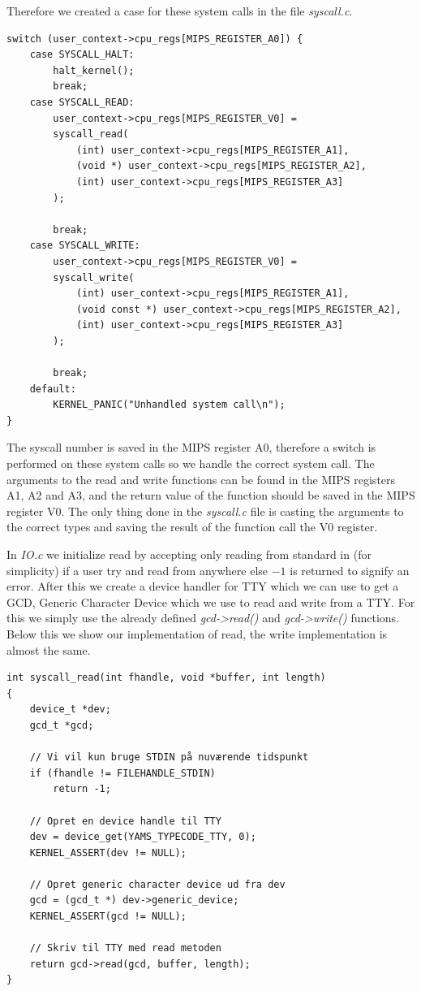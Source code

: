 \documentclass[11pt]{article}
\begin{document}
Therefore we created a case for these system calls in the file
\textit{syscall.c}.

\begin{lstlisting}[style=customc]
switch (user_context->cpu_regs[MIPS_REGISTER_A0]) {
    case SYSCALL_HALT:
        halt_kernel();
        break;
    case SYSCALL_READ:
        user_context->cpu_regs[MIPS_REGISTER_V0] =
        syscall_read(
            (int) user_context->cpu_regs[MIPS_REGISTER_A1],
            (void *) user_context->cpu_regs[MIPS_REGISTER_A2],
            (int) user_context->cpu_regs[MIPS_REGISTER_A3]
        );

        break;
    case SYSCALL_WRITE:
        user_context->cpu_regs[MIPS_REGISTER_V0] =
        syscall_write(
            (int) user_context->cpu_regs[MIPS_REGISTER_A1],
            (void const *) user_context->cpu_regs[MIPS_REGISTER_A2],
            (int) user_context->cpu_regs[MIPS_REGISTER_A3]
        );

        break;
    default:
        KERNEL_PANIC("Unhandled system call\n");
}
\end{lstlisting}

The syscall number is saved in the MIPS register A0, therefore a switch is
performed on these system calls so we handle the correct system call.  The
arguments to the read and write functions can be found in the MIPS registers
A1, A2 and A3, and the return value of the function should be saved in the MIPS
register V0.  The only thing done in the \textit{syscall.c} file is casting the
arguments to the correct types and saving the result of the function call the V0
register.

In \textit{IO.c} we initialize read by accepting only reading from standard in
(for simplicity) if a user try and read from anywhere else $-1$ is returned to
signify an error.  After this we create a device handler for TTY which we can
use to get a GCD, Generic Character Device which we use to read and write from a
TTY.  For this we simply use the already defined \emph{gcd->read()} and
\emph{gcd->write()} functions.  Below this we show our implementation of read,
the write implementation is almost the same.

\begin{lstlisting}[style=customc]
int syscall_read(int fhandle, void *buffer, int length)
{
    device_t *dev;
    gcd_t *gcd;

    // Vi vil kun bruge STDIN på nuværende tidspunkt
    if (fhandle != FILEHANDLE_STDIN)
        return -1;

    // Opret en device handle til TTY
    dev = device_get(YAMS_TYPECODE_TTY, 0);
    KERNEL_ASSERT(dev != NULL);

    // Opret generic character device ud fra dev
    gcd = (gcd_t *) dev->generic_device;
    KERNEL_ASSERT(gcd != NULL);

    // Skriv til TTY med read metoden
    return gcd->read(gcd, buffer, length);
}
\end{lstlisting}
\end{document}
